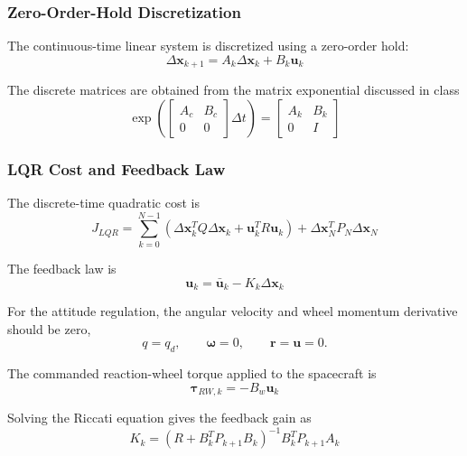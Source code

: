 \documentclass[conference,onecolumn,draftclsnofoot]{IEEEtran}
\begin{document}
\subsubsection{Zero-Order-Hold Discretization}

The continuous-time linear system is discretized using a zero-order hold:
\begin{equation}
\Delta \mathbf x_{k+1}
=
A_k\Delta \mathbf x_k
+
B_k\mathbf u_k
\end{equation}

The discrete matrices are obtained from the matrix exponential discussed in class
\begin{equation}
\exp
\left(
\begin{bmatrix}
A_c & B_c\\
0 & 0
\end{bmatrix}
\Delta t
\right)
=
\begin{bmatrix}
A_k & B_k\\
0 & I
\end{bmatrix}
\end{equation}

\subsubsection{LQR Cost and Feedback Law}

The discrete-time quadratic cost is
\begin{equation}
J_{LQR}
=
\sum_{k=0}^{N-1}
\left(
\Delta\mathbf x_k^TQ\Delta\mathbf x_k
+
\mathbf u_k^TR\mathbf u_k
\right)
+
\Delta\mathbf x_N^TP_N\Delta\mathbf x_N
\end{equation}

The feedback law is
\begin{equation}
\mathbf u_k
=
\bar{\mathbf{u}}_k
-
K_k\Delta\mathbf x_k
\end{equation}

For the attitude regulation, the angular velocity and wheel momentum derivative should be zero,
\begin{equation}
q=q_d,
\qquad
\boldsymbol{\omega}=0,
\qquad
\mathbf{r} = \mathbf{u} =0.
\end{equation}

The commanded reaction-wheel torque applied to the spacecraft is
\begin{equation}
\boldsymbol{\tau}_{RW,k}
=
-B_w\mathbf u_k
\end{equation}

Solving the Riccati equation gives the feedback gain as
\begin{equation}
K_k
=
\left(
R+B_k^TP_{k+1}B_k
\right)^{-1}
B_k^TP_{k+1}A_k
\end{equation}
\end{document}
